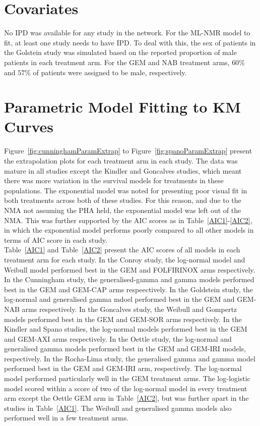 \section{Covariates}
No IPD was available for any study in the network. For the ML-NMR model to fit, at least one study needs to have IPD. To deal with this, the sex of patients in the Golstein study was simulated based on the reported proportion of male patients in each treatment arm. For the GEM and NAB treatment arms, $60\%$ and $57\%$ of patients were assigned to be male, respectively. 

\section{Parametric Model Fitting to KM Curves}
Figure~\ref{fig:cunninghamParamExtrap} to Figure~\ref{fig:spanoParamExtrap} present the extrapolation plots for each treatment arm in each study. The data was mature in all studies except the Kindler and Goncalves studies, which meant there was more variation in the survival models for treatments in these populations. The exponential model was noted for presenting poor visual fit in both treatments across both of these studies. For this reason, and due to the NMA not assuming the PHA held, the exponential model was left out of the NMA. This was further supported by the AIC scores as in Table~\ref{AIC1}-\ref{AIC2}, in which the exponential model performs poorly compared to all other models in terms of AIC score in each study.\\

Table~\ref{AIC1} and Table~\ref{AIC2} present the AIC scores of all models in each treatment arm for each study. In the Conroy study, the log-normal model and Weibull model performed best in the GEM and FOLFIRINOX arms respectively. In the Cunningham study, the generalised-gamma and gamma models performed best in the GEM and GEM-CAP arms respeectively. In the Goldstein study, the log-normal and generalised gamma mdoel performed best in the GEM and GEM-NAB arms respectively. In the Goncalves study, the Weibull and Gompertz models performed best in the GEM and GEM-SOR arms respectively. In the Kindler and Spano studies, the log-normal models performed best in the GEM and GEM-AXI arms respectively. In the Oettle study, the log-normal and generalised gamma models performed best in the GEM and GEM-IRI models, respectively. In the Rocha-Lima study, the generalised gamma and gamma model performed best in the GEM and GEM-IRI arm, respectively. The log-normal model performed particularly well in the GEM treatment arms. The log-logistic model scored within a score of two of the log-normal model in every treatment arm except the Oettle GEM arm in Table~\ref{AIC2}, but was further apart in the studies in Table~\ref{AIC1}. The Weibull and generalised gamma models also performed well in a few treatment arms. \\

